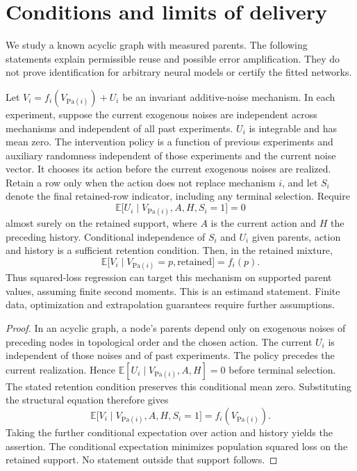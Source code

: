 \section{Conditions and limits of delivery}
\label{sec:theory}
We study a known acyclic graph with measured parents. The following statements
explain permissible reuse and possible error amplification. They do not prove
identification for arbitrary neural models or certify the fitted networks.

\begin{samepage}
\begin{proposition}
Let $V_i=f_i(V_{\mathrm{Pa}(i)})+U_i$ be an invariant additive-noise
mechanism. In each experiment, suppose the current exogenous noises are
independent across mechanisms and independent of all past experiments. $U_i$
is integrable and has mean zero. The intervention policy is a function of previous experiments and auxiliary
randomness independent of those experiments and the current noise vector.
It chooses its action before the current exogenous noises are realized. Retain a row only when the action does not replace mechanism $i$,
and let $S_i$ denote the final retained-row indicator, including any terminal
selection. Require
\[
 \mathbb E\bigl[U_i\mid V_{\mathrm{Pa}(i)},A,H,S_i=1\bigr]=0
\]
almost surely on the retained support, where $A$ is the current action and $H$ the preceding
history. Conditional independence of $S_i$ and $U_i$ given parents, action and
history is a sufficient retention condition. Then, in the retained mixture,
\[
 \mathbb E\bigl[V_i\mid V_{\mathrm{Pa}(i)}=p,\text{retained}\bigr]=f_i(p).
\]
Thus squared-loss regression can target this mechanism on supported parent
values, assuming finite second moments. This is an estimand statement. Finite
data, optimization and extrapolation guarantees require further assumptions.
\end{proposition}
\end{samepage}
\begin{proof}
In an acyclic graph, a node's parents depend only on exogenous noises of
preceding nodes in topological order and the chosen action. The current $U_i$
is independent of those noises and of past experiments. The policy precedes the current realization. Hence
$\mathbb E[U_i\mid V_{\mathrm{Pa}(i)},A,H]=0$ before terminal selection.
The stated retention condition preserves this conditional mean zero. Substituting the structural equation therefore gives
\[
 \mathbb E\bigl[V_i\mid V_{\mathrm{Pa}(i)},A,H,S_i=1\bigr]
 =f_i(V_{\mathrm{Pa}(i)}).
\]
Taking the further conditional expectation over
action and history yields the assertion.
The conditional expectation minimizes population squared loss on the retained
support. No statement outside that support follows.
\end{proof}

